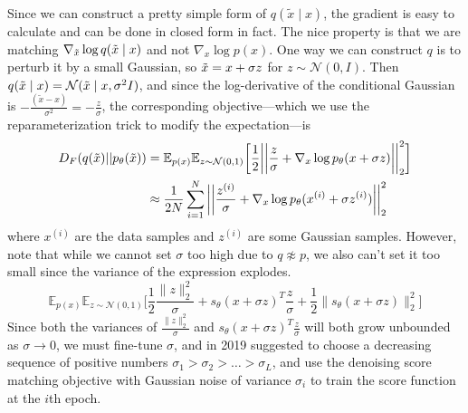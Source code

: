 \documentclass{article}
\begin{document}
    Since we can construct a pretty simple form of $q(\tilde{x} \mid x)$, the gradient is easy to calculate and can be done in closed form in fact. The nice property is that we are matching $\nabla_{\Tilde{x}} \log q(\Tilde{x} \mid x)$ and not $\nabla_x \log p(x)$. One way we can construct $q$ is to perturb it by a small Gaussian, so $\Tilde{x} = x + \sigma z$ for $z \sim \mathcal{N}(0, I)$. Then $q(\Tilde{x} \mid x) = \mathcal{N}(\Tilde{x} \mid x, \sigma^2 I)$, and since the log-derivative of the conditional Gaussian is $-\frac{(\tilde{x} - x)}{\sigma^2} = -\frac{z}{\sigma}$, the corresponding objective---which we use the reparameterization trick to modify the expectation---is 
    \begin{align}
      D_F (q(\Tilde{x}) || p_\theta (\Tilde{x})) & = \mathbb{E}_{p(x)} \mathbb{E}_{z \sim \mathcal{N}(0, 1)} \bigg[ \frac{1}{2} \bigg| \bigg| \frac{z}{\sigma} + \nabla_x \log p_\theta (x + \sigma z) \bigg| \bigg|_2^2 \bigg] \\
                                                 & \approx \frac{1}{2N} \sum_{i=1}^N \bigg|\bigg| \frac{z^{(i)}}{\sigma} + \nabla_x \log p_\theta (x^{(i)} + \sigma z^{(i)}) \bigg|\bigg|_2^2
    \end{align}
    where $x^{(i)}$ are the data samples and $z^{(i)}$ are some Gaussian samples. However, note that while we cannot set $\sigma$ too high due to $q \not\approx p$, we also can't set it too small since the variance of the expression explodes. 
    \begin{equation}
      \mathbb{E}_{p(x)} \mathbb{E}_{z \sim \mathcal{N}(0, 1)} \bigg[ \frac{1}{2}\frac{\|z\|_2^2}{\sigma} + s_\theta(x + \sigma z)^T \frac{z}{\sigma} + \frac{1}{2}\big\|s_\theta(x + \sigma z)\big\|_2^2 \bigg]
    \end{equation}
    Since both the variances of $\frac{\|z\|_2^2}{\sigma}$ and $s_\theta(x + \sigma z)^T \frac{z}{\sigma}$ will both grow unbounded as $\sigma \rightarrow 0$, we must fine-tune $\sigma$, and \cite{score} in 2019 suggested to choose a decreasing sequence of positive numbers $\sigma_1 > \sigma_2 > \ldots > \sigma_L$, and use the denoising score matching objective with Gaussian noise of variance $\sigma_i$ to train the score function at the $i$th epoch. 
\end{document}
